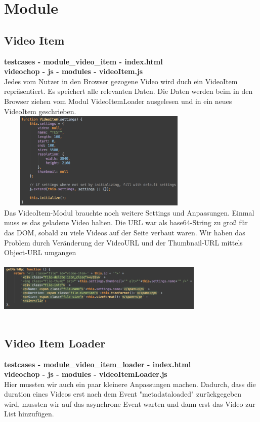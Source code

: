 \documentclass[a4paper,10pt]{scrartcl}
\begin{document}
\section{Module}
\subsection{Video Item}
\textbf{testcases - module\_video\_item - index.html} \\
\textbf{videochop - js - modules - videoItem.js} \\
Jedes vom Nutzer in den Browser gezogene Video wird duch ein VideoItem repräsentiert. Es speichert alle relevanten Daten. Die Daten werden beim in den Browser ziehen vom Modul VideoItemLoader ausgelesen und in ein neues VideoItem geschrieben.\\
\includegraphics[height=176px, width=375px]{images/videoitem.png}\\
Das VideoItem-Modul brauchte noch weitere Settings und Anpassungen. Einmal muss es das geladene Video halten. Die URL war als base64-String zu groß für das DOM, sobald zu viele Videos auf der Seite verbaut waren. Wir haben das Problem durch Veränderung der VideoURL und der Thumbnail-URL mittels Object-URL umgangen \\
\includegraphics[height=120px, width=375px]{images/videoitem2.png}\\
\subsection{Video Item Loader}
\textbf{testcases - module\_video\_item\_loader - index.html} \\
\textbf{videochop - js - modules - videoItemLoader.js} \\
Hier mussten wir auch ein paar kleinere Anpassungen machen. Dadurch, dass die duration eines Videos erst nach dem Event "metadataloaded" zurückgegeben wird, mussten wir auf das asynchrone Event warten und dann erst das Video zur List hinzufügen.
\end{document}
